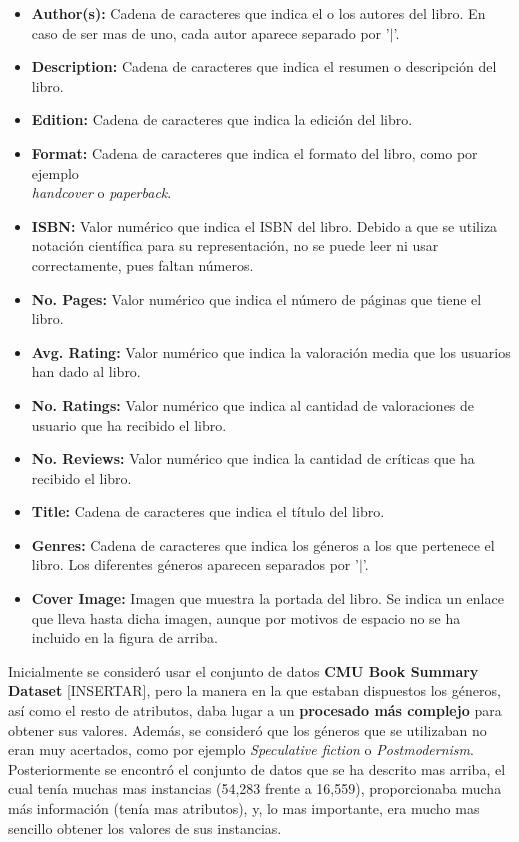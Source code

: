 \documentclass[12pt,a4paper, xcolor=table]{article}
\begin{document}
    \begin{itemize}
        \item \textbf{Author(s):} Cadena de caracteres que indica el o los autores del libro. En caso de ser mas de uno, cada autor aparece separado por '$\mid$'.
        \item \textbf{Description:} Cadena de caracteres que indica el resumen o descripción del libro.
        \item \textbf{Edition:} Cadena de caracteres que indica la edición del libro.
        \item \textbf{Format:} Cadena de caracteres que indica el formato del libro, como por ejemplo \\
        \textit{handcover} o \textit{paperback}.
        \item \textbf{ISBN:} Valor numérico que indica el ISBN del libro. Debido a que se utiliza notación científica para su representación, no se puede leer ni usar correctamente, pues faltan números.
        \item \textbf{No. Pages:} Valor numérico que indica el número de páginas que tiene el libro.
        \item \textbf{Avg. Rating:} Valor numérico que indica la valoración media que los usuarios han dado al libro.
        \item \textbf{No. Ratings:}  Valor numérico que indica al cantidad de valoraciones de usuario que ha recibido el libro.
        \item \textbf{No. Reviews:} Valor numérico que indica la cantidad de críticas que ha recibido el libro.
        \item \textbf{Title:} Cadena de caracteres que indica el título del libro.
        \item \textbf{Genres:} Cadena de caracteres que indica los géneros a los que pertenece el libro. Los diferentes géneros aparecen separados por '$\mid$'.
        \item \textbf{Cover Image:} Imagen que muestra la portada del libro. Se indica un enlace que lleva hasta dicha imagen, aunque por motivos de espacio no se ha incluido en la figura de arriba.
    \end{itemize}

    \vspace{3mm}

    Inicialmente se consideró usar el conjunto de datos\textbf{ CMU Book Summary Dataset} [INSERTAR], pero la manera en la que estaban dispuestos los géneros, así como el resto de atributos, daba lugar a un \textbf{procesado más complejo} para obtener sus valores. Además, se consideró que los géneros que se utilizaban no eran muy acertados, como por ejemplo \textit{Speculative fiction} o \textit{Postmodernism}. Posteriormente se encontró el conjunto de datos que se ha descrito mas arriba, el cual tenía muchas mas instancias (54,283 frente a 16,559), proporcionaba mucha más información (tenía mas atributos), y, lo mas importante, era mucho mas sencillo obtener los valores de sus instancias.
\end{document}
